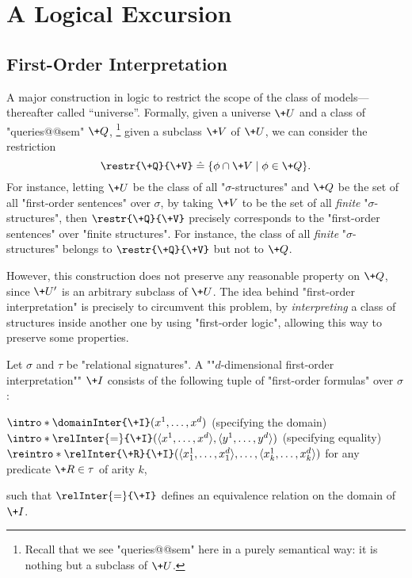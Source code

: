 \section{A Logical Excursion}
\label{sec:preliminaries-automatic-structures-logic}

\subsection{First-Order Interpretation}

A major construction in logic to restrict the scope of the class
of models---thereafter called ``universe''.
Formally, given a universe $\+U$ and a class of "queries@@sem" $\+Q$,%
\footnote{Recall that we see "queries@@sem" here in a purely semantical way: it is nothing but a subclass of $\+U$.}
given a subclass $\+V$ of $\+U$, we can consider the restriction
\[
	\restr{\+Q}{\+V} \defeq \{\phi \cap \+V \mid \phi \in \+Q\}.
\]
For instance, letting $\+U$ be the class of all "$\sigma$-structures" and $\+Q$ be the set of all 
"first-order sentences" over $\sigma$, by taking $\+V$ to be the set of all \emph{finite}
"$\sigma$-structures", then $\restr{\+Q}{\+V}$ precisely corresponds to
the "first-order sentences" over "finite structures". For instance, the class of all
\emph{finite} "$\sigma$-structures" belongs to $\restr{\+Q}{\+V}$ but not to
$\+Q$.

However, this construction does not preserve any reasonable property on $\+Q$,
since $\+U'$ is an arbitrary subclass of $\+U$. The idea behind "first-order interpretation"
is precisely to circumvent this problem, by \emph{interpreting} a class of structures
inside another one by using "first-order logic", allowing this way to preserve some properties.

Let $\sigma$ and $\tau$ be "relational signatures".
A \AP ""$d$-dimensional first-order interpretation"" $\+I$ consists of the following tuple of
"first-order formulas" over $\sigma$:
\begin{itemize}
	\itemAP $\intro*\domainInter{\+I}(x^1,\hdots, x^d)$ (specifying the domain)
	\itemAP $\intro*\relInter{=}{\+I}(\tup{x^1,\hdots, x^d}, \tup{y^1,\hdots, y^d})$ (specifying equality)
	\itemAP $\reintro*\relInter{\+R}{\+I}(\tup{x^1_1,\hdots,x^d_1}, \hdots, \tup{x^1_k,\hdots,x^d_k})$
		for any predicate $\+R \in \tau$ of arity $k$,
\end{itemize}
such that $\relInter{=}{\+I}$ defines an equivalence relation on the domain of $\+I$.


